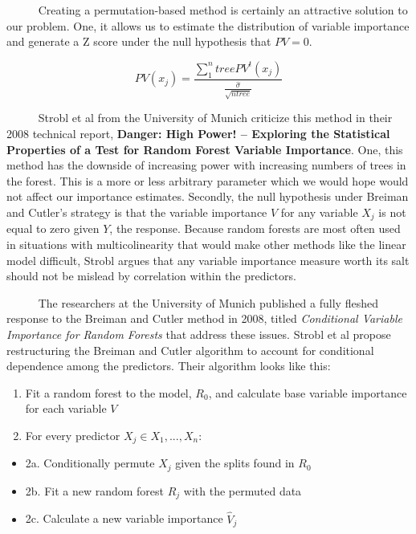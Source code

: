 \documentclass[12pt,twoside]{reedthesis}
\providecommand{\tightlist}{%
  \setlength{\itemsep}{0pt}\setlength{\parskip}{0pt}}
\begin{document}
  ~~~~~ Creating a permutation-based method is certainly an attractive
  solution to our problem. One, it allows us to estimate the distribution
  of variable importance and generate a Z score under the null hypothesis
  that \(PV = 0\).
  
  \[PV(x_j) = \frac{\sum_1^ntree PV^t(x_j)}{\frac{\hat{\sigma}}{\sqrt{ntree}}}\]
  
  ~~~~~ Strobl et al from the University of Munich criticize this method
  in their 2008 technical report, \textbf{Danger: High Power! -- Exploring
  the Statistical Properties of a Test for Random Forest Variable
  Importance}. One, this method has the downside of increasing power with
  increasing numbers of trees in the forest. This is a more or less
  arbitrary parameter which we would hope would not affect our importance
  estimates. Secondly, the null hypothesis under Breiman and Cutler's
  strategy is that the variable importance \(V\) for any variable \(X_j\)
  is not equal to zero given \(Y\), the response. Because random forests
  are most often used in situations with multicolinearity that would make
  other methods like the linear model difficult, Strobl argues that any
  variable importance measure worth its salt should not be mislead by
  correlation within the predictors.
  
  ~~~~~ The researchers at the University of Munich published a fully
  fleshed response to the Breiman and Cutler method in 2008, titled
  \emph{Conditional Variable Importance for Random Forests} that address
  these issues. Strobl et al propose restructuring the Breiman and Cutler
  algorithm to account for conditional dependence among the predictors.
  Their algorithm looks like this:
  
  \begin{enumerate}
  \def\labelenumi{\arabic{enumi}.}
  \tightlist
  \item
    Fit a random forest to the model, \(R_0\), and calculate base variable
    importance for each variable \(V\)
  \item
    For every predictor \(X_j \in X_1,...,X_n\):
  \end{enumerate}
  
  \begin{itemize}
  \tightlist
  \item
    2a. Conditionally permute \(X_j\) given the splits found in \(R_0\)
  \item
    2b. Fit a new random forest \(R_j\) with the permuted data
  \item
    2c. Calculate a new variable importance \(\hat{V}_j\)
  \end{itemize}
  
\end{document}
